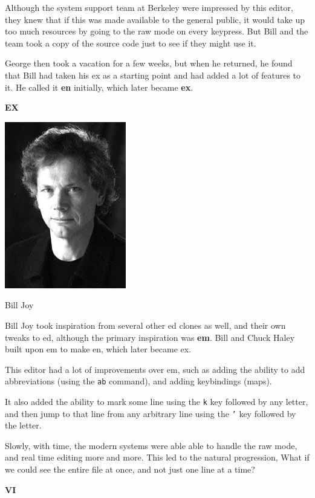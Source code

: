 Although the system support team at Berkeley were
impressed by this editor, they knew that if this
was made available to the general public, it would
take up too much resources by going to the raw mode
on every keypress.
But Bill and the team took a copy of the source code
just to see if they might use it.

George then took a vacation for a few weeks,
but when he returned, he found that Bill had
taken his ex as a starting point and had
added a lot of features to it. He called it
\textbf{en} initially, which later became \textbf{ex}.

\textbf{EX}

\begin{marginfigure}
  \includegraphics{images/png/billjoy.png}
  \caption{Bill Joy}
\end{marginfigure}


Bill Joy took inspiration from several other ed clones as well,
and their own tweaks to ed,
although the primary inspiration was \textbf{em}.
Bill and Chuck Haley built upon em to make en, which later became ex.

This editor had a lot of improvements over em,
such as adding the ability to add abbreviations
(using the \texttt{ab} command),
and adding keybindings (maps).

It also added the ability to mark some line
using the \texttt{k} key followed by any letter,
and then jump to that line from any arbitrary line
using the \texttt{'} key followed by the letter.

Slowly, with time, the modern systems were able able
to handle the raw mode, and real time editing more and more.
This led to the natural progression, What if we could
see the entire file at once, and not just one line at a time?

\textbf{VI}

